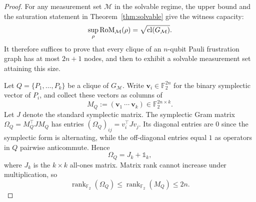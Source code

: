 \documentclass[10pt,aps,pra,twocolumn,floatfix,nofootinbib,superscriptaddress,longbibliography]{revtex4-2}
\newcommand{\Ftwo}{\mathbb F_2}
\newcommand{\Mcal}{\mathcal M}
\newcommand{\RoM}{\mathrm{RoM}}
\providecommand{\mathbm}[1]{\bm{#1}}
\begin{document}
\begin{bibunit}[apsrev4-2]
\begin{proposition}
		\end{proposition}
		
		\begin{proof}
			
			For any measurement set $\Mcal$ in the solvable regime, the upper bound and the saturation statement in Theorem~\ref{thm:solvable} give the witness capacity:
			\begin{equation}
				\displaystyle
				\sup_\rho\RoM_\Mcal(\rho)
				=\sqrt{\clnum(G_\Mcal)}.
			\end{equation}
			It therefore suffices to prove that every clique of an $n$-qubit Pauli frustration graph has at most $2n+1$ nodes, and then to exhibit a solvable measurement set attaining this size.
			
			Let $Q=\{P_1,\ldots,P_k\}$ be a clique of $G_\Mcal$. Write $\mathbm{v}_i\in\Ftwo^{2n}$ for the binary symplectic vector of $P_i$, and collect these vectors as columns of
			\begin{equation}
				\displaystyle
				M_Q:=(\mathbm{v}_1\ \cdots\ \mathbm{v}_k)\in\Ftwo^{2n\times k}.
			\end{equation}
			Let $J$ denote the standard symplectic matrix. The symplectic Gram matrix $\Omega_Q=M_Q^\top J M_Q$ has entries $(\Omega_Q)_{ij}=v_i^\top Jv_j$. Its diagonal entries are $0$ since the symplectic form is alternating, while the off-diagonal entries equal $1$ as operators in $Q$ pairwise anticommute. Hence
			\begin{equation}
				\displaystyle
				\Omega_Q=J_k+\mathbb{1}_k,
			\end{equation}
			where $J_k$ is the $k\times k$ all-ones matrix. Matrix rank cannot increase under multiplication, so
			\begin{equation}
				\displaystyle
				\operatorname{rank}_{\Ftwo}(\Omega_Q)
				\le\operatorname{rank}_{\Ftwo}(M_Q)
				\le2n.
			\end{equation}
			

\end{proof}
\end{bibunit}
\end{document}
